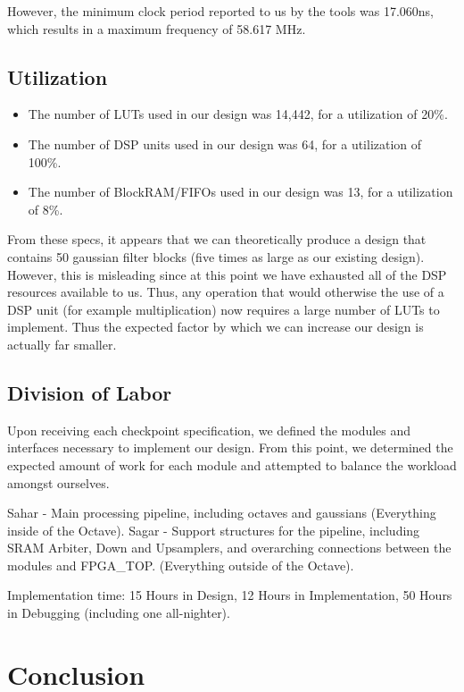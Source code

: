 However, the minimum clock period reported to us by the tools was 17.060ns, 
which results in a maximum frequency of 58.617 MHz.

\subsection{Utilization}

\begin{itemize}\itemsep0em
\item The number of LUTs used in our design was 14,442, for a utilization of 20\%.
\item The number of DSP units used in our design was 64, for a utilization of 100\%.
\item The number of BlockRAM/FIFOs used in our design was 13, for a utilization of 8\%.
\end{itemize}

From these specs, it appears that we can theoretically produce a design that contains 50 gaussian filter blocks (five times as large as
our existing design). However, this is misleading since at this point we have exhausted all of the 
DSP resources available to us. Thus, any operation that would otherwise the use of a DSP unit (for example
multiplication) now requires a large number of LUTs to implement. Thus the expected factor
by which we can increase our design is actually far smaller.

\subsection{Division of Labor}

Upon receiving each checkpoint specification, we defined the modules and interfaces
necessary to implement our design. From this point, we determined the expected 
amount of work for each module and attempted to balance the workload amongst ourselves.

Sahar - Main processing pipeline, including octaves and gaussians (Everything inside of the Octave).
Sagar - Support structures for the pipeline, including SRAM Arbiter, Down and Upsamplers, and
overarching connections between the modules and FPGA\_TOP. (Everything outside of the Octave).

Implementation time: 15 Hours in Design, 12 Hours in Implementation, 50 Hours in Debugging (including one all-nighter).

\section{Conclusion}

